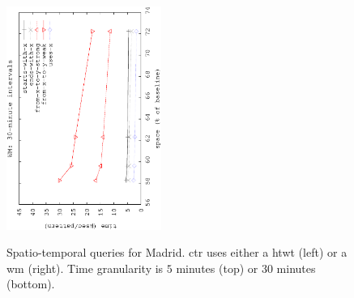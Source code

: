 \begin{figure}[!ht]
\begin{center}
			{\includegraphics[angle=-90,width=0.45\textwidth]{figures_synt/madrid_wm30.eps}}
			
		\end{center}
		\vspace{-0.3cm}
		\caption{Spatio-temporal queries for Madrid. \acrshort{ctr} uses either a \acrlong{htwt} (left) or a \acrlong{wm} (right). 
			Time granularity is $5$ minutes (top) or $30$ minutes (bottom). 
		}
		\label{fig:madridst}
		\vspace{-0.3cm}




\end{figure}
